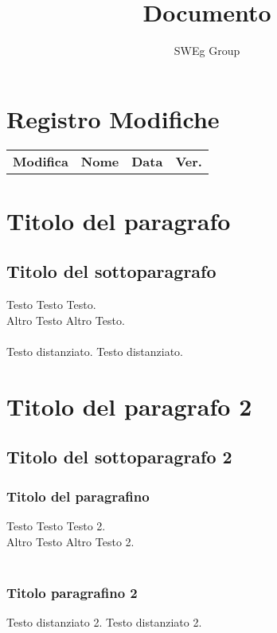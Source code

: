 \documentclass[12pt,a4paper,titlepage]{article}
\renewcommand{\headrulewidth}{0.4pt}
\renewcommand{\footrulewidth}{0.4pt}
\begin{document}
 

\title{Documento}
\author{SWEg Group}
\date{}
\maketitle

\chead{}
\cfoot{}
\rfoot{\thepage}
\renewcommand{\headrulewidth}{0.2pt}
\renewcommand{\footrulewidth}{0.2pt}

\section{Registro Modifiche}
\small %
\begin{tabular}{|l|c|c|c|}
\hline
{\textbf{Modifica}}&{\textbf{Nome}}&{\textbf{Data}}&{\textbf{Ver.}}\\
\end{tabular}

\tableofcontents
\thispagestyle{empty}

\newpage



\section{Titolo del paragrafo}
\subsection{Titolo del sottoparagrafo}
Testo Testo Testo.\\
Altro Testo Altro Testo.\\
\\
Testo distanziato. Testo distanziato. 

\section{Titolo del paragrafo 2}
\subsection{Titolo del sottoparagrafo 2}
\subsubsection{Titolo del paragrafino}
Testo Testo Testo 2.\\
Altro Testo Altro Testo 2.\\
\\
\subsubsection{Titolo paragrafino 2}
Testo distanziato 2. Testo distanziato 2. 
\end{document}
